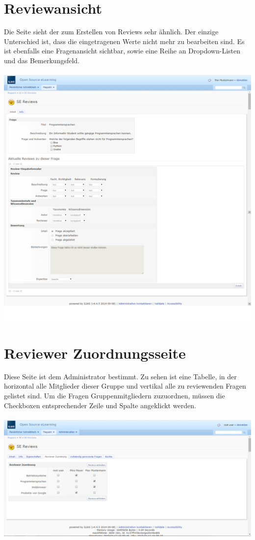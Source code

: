 \documentclass[12pt,a4paper]{scrreprt}
\begin{document}
\section{Reviewansicht}
Die Seite sieht der zum Erstellen von Reviews sehr ähnlich. Der einzige Unterschied ist, dass die eingetragenen Werte nicht mehr zu bearbeiten sind. Es ist ebenfalls eine Fragenansicht sichtbar, sowie  eine Reihe an Dropdown-Listen und das Bemerkungsfeld. \\
\\
\includegraphics[width=1.0\textwidth]{reviewausgabe.png}
\\
\section{Reviewer Zuordnungsseite}
Diese Seite ist dem Administrator bestimmt. Zu sehen ist eine Tabelle, in der horizontal alle Mitglieder dieser Gruppe und vertikal alle zu reviewenden Fragen gelistet sind. Um die Fragen Gruppenmitgliedern zuzuordnen, müssen die Checkboxen entsprechender Zeile und Spalte angeklickt werden. \\
\\
\includegraphics[width=1.0\textwidth]{reviewer_zuordnen.png}
\\
\end{document}
